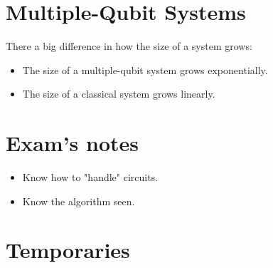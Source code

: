 \documentclass[12pt,a4paper]{report}
\begin{document}
\pagebreak
\section{Multiple-Qubit Systems}
There a big difference in how the size of a system grows:
\begin{itemize}
\item The size of a multiple-qubit system grows exponentially.
\item The size of a classical system grows linearly.
\end{itemize}


\pagebreak
\section{Exam's notes}

\begin{itemize}
\item Know how to "handle" circuits.
\item Know the algorithm seen.
\end{itemize}

\section{Temporaries}
\end{document}
